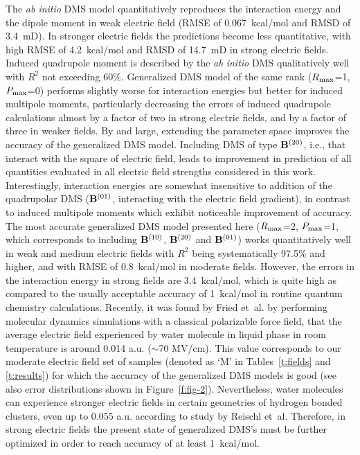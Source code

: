 \documentclass[aip,amsmath,amssymb,reprint,floatfix]{revtex4-1}
\begin{document}
The \emph{ab initio} DMS model quantitatively reproduces the interaction energy and the dipole moment 
in weak electric field (RMSE of 0.067~kcal/mol and RMSD of 3.4~mD). In stronger electric fields
the predictions become less quantitative, with high RMSE of 4.2~kcal/mol and RMSD of 14.7~mD in strong electric fields.
Induced quadrupole moment is described by the \emph{ab initio} DMS qualitatively well with $R^2$ not exceeding
60\%. Generalized DMS model of the same rank ($R_{\rm max}$=1, $P_{\rm max}$=0) performs slightly worse
for interaction energies but better for induced multipole moments, particularly decreasing the errors of induced quadrupole
calculations almost by a factor of two in strong electric fields, and by a factor of three in weaker fields.
By and large, extending the parameter space improves the accuracy of the generalized DMS model. 
Including DMS of type ${\bf B}^{(20)}$, i.e., that interact with the square of electric field,
leads to improvement in prediction of all quantities evaluated in all electric field strengths considered in this work. 
Interestingly, interaction energies are somewhat insensitive to addition of the quadrupolar DMS 
(${\bf B}^{(01)}$, interacting with the electric field gradient), in contrast to induced multipole moments
which exhibit noticeable improvement of accuracy. The most accurate generalized DMS model presented here 
($R_{\rm max}$=2, $P_{\rm max}$=1, which corresponds to including ${\bf B}^{(10)}$, ${\bf B}^{(20)}$ and ${\bf B}^{(01)}$)
works quantitatively well in weak and medium electric fields with $R^2$ being systematically 97.5\% and higher,
and with RMSE of 0.8~kcal/mol in moderate fields. 
However, the errors in the interaction energy
in strong fields are 3.4~kcal/mol, which is quite high as compared to the usually acceptable accuracy 
of 1~kcal/mol in routine quantum chemistry calculations. 
Recently, it was found by Fried et~al. by performing molecular dynamics simulations with a classical 
polarizable force field, that the average electric field experienced by water molecule in liquid phase
in room temperature is around 0.014 a.u. ($\sim$70 MV/cm).\cite{Fried.Wang.Boxer.Ren.Pande.JPCB.2013}
This value corresponds to our moderate electric field set of samples (denoted as `M' in Tables~\ref{t:fields}
and \ref{t:results}) for which the
accuracy of the generalized DMS models is good 
(see also error distributions shown in Figure~\ref{f:fig-2}).
Nevertheless, water molecules can experience
stronger electric fields in certain geometries of hydrogen bonded clusters, 
even up to 0.055 a.u. according to study by Reischl et~al.\cite{Reischl.Kofinger.Dellago.MolPhys.2009} 
Therefore, in strong electric fields
the present state of generalized DMS's must be further optimized in order to reach accuracy of at least
1~kcal/mol. 
\end{document}
